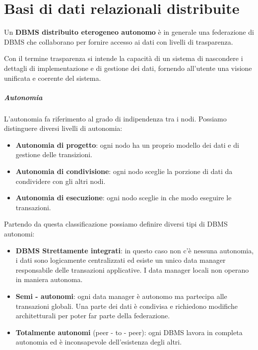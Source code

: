 \chapter{Basi di dati relazionali distribuite}
\begin{definizione}
    Un \textbf{DBMS distribuito eterogeneo autonomo} è in generale una
    federazione di DBMS che collaborano per fornire accesso ai dati con livelli
    di trasparenza.
\end{definizione}
Con il termine trasparenza si intende la capacità di un sistema di
nascondere i dettagli di implementazione e di gestione dei dati, fornendo
all'utente una visione unificata e coerente del sistema.
\paragraph{Autonomia} L'autonomia fa riferimento al grado di indipendenza tra i
nodi. Possiamo distinguere diversi livelli di autonomia:
\begin{itemize}
    \item \textbf{Autonomia di progetto}: ogni nodo ha un proprio modello dei
          dati e di gestione delle transizioni.
    \item \textbf{Autonomia di condivisione}: ogni nodo sceglie la porzione di
          dati da condividere con gli altri nodi.
    \item \textbf{Autonomia di esecuzione}: ogni nodo sceglie in che modo eseguire
          le transazioni.
\end{itemize}
Partendo da questa classificazione possiamo definire diversi tipi di DBMS autonomi:
\begin{itemize}
    \item \textbf{DBMS Strettamente integrati}: in questo caso non c'è nessuna
          autonomia, i dati sono logicamente centralizzati ed esiste un unico
          data manager responsabile delle transazioni applicative. I data
          manager locali non operano in maniera autonoma.
    \item \textbf{Semi - autonomi}: ogni data manager è autonomo ma partecipa
          alle transazioni globali. Una parte dei dati è condivisa e richiedono
          modifiche architetturali per poter far parte della federazione.
    \item \textbf{Totalmente autonomi} (peer - to - peer): ogni DBMS lavora in
          completa autonomia ed è inconsapevole dell'esistenza degli altri.
\end{itemize}
